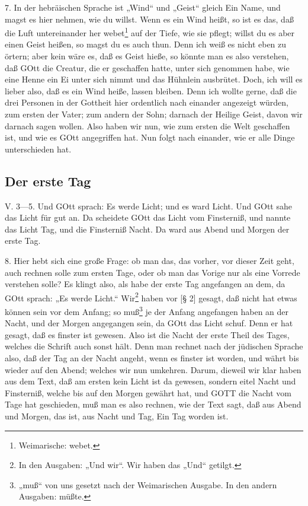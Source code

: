 7. In der hebräischen Sprache ist „Wind“ und „Geist“ gleich Ein Name, und magst es hier nehmen, wie du willst. Wenn es ein Wind heißt, so ist es das, daß die Luft untereinander her webet\footnote{Weimarische: webet.} auf der Tiefe, wie sie pflegt; willst du es aber einen Geist heißen, so magst du es auch thun. Denn ich weiß es nicht eben zu örtern; aber kein wäre es, daß es Geist hieße, so könnte man es also verstehen, daß GOtt die Creatur, die er geschaffen hatte, unter sich genommen habe, wie eine Henne ein Ei unter sich nimmt und das Hühnlein ausbrütet. Doch, ich will es lieber also, daß es ein Wind heiße, lassen bleiben. Denn ich wollte gerne, daß die drei Personen in der Gottheit hier ordentlich nach einander angezeigt würden, zum ersten der Vater; zum andern der Sohn; darnach der Heilige Geist, davon wir darnach sagen wollen. Also haben wir nun, wie zum ersten die Welt geschaffen ist, und wie es GOtt angegriffen hat. Nun folgt nach einander, wie er alle Dinge unterschieden hat.

\subsection{Der erste Tag}

\begin{schriftzitat}
V. 3—5. Und GOtt sprach: Es werde Licht; und es ward Licht. Und GOtt sahe das Licht für gut an. Da scheidete GOtt das Licht vom Finsterniß, und nannte das Licht Tag, und die Finsterniß Nacht. Da ward aus Abend und Morgen der erste Tag.
\end{schriftzitat}

8. Hier hebt sich eine große Frage: ob man das, das vorher, vor dieser Zeit geht, auch rechnen solle zum ersten Tage, oder ob man das Vorige nur als eine Vorrede verstehen solle? Es klingt also, als habe der erste Tag angefangen an dem, da GOtt sprach: „Es werde Licht.“ Wir\footnote{In den Ausgaben: „Und wir“. Wir haben das „Und“ getilgt.} haben vor [§ 2] gesagt, daß nicht hat etwas können sein vor dem Anfang; so muß\footnote{„muß“ von uns gesetzt nach der Weimarischen Ausgabe. In den andern Ausgaben: müßte.} je der Anfang angefangen haben an der Nacht, und der Morgen angegangen sein, da GOtt das Licht schuf. Denn er hat gesagt, daß es finster ist gewesen. Also ist die Nacht der erste Theil des Tages, welches die Schrift auch sonst hält. Denn man rechnet nach der jüdischen Sprache also, daß der Tag an der Nacht angeht, wenn es finster ist worden, und währt bis wieder auf den Abend; welches wir nun umkehren. Darum, dieweil wir klar haben aus dem Text, daß am ersten kein Licht ist da gewesen, sondern
eitel Nacht und Finsterniß, welche bis auf den Morgen gewährt hat, und GOTT die Nacht vom Tage hat geschieden, muß man es also rechnen, wie der Text sagt, daß aus Abend und Morgen, das ist, aus Nacht und Tag, Ein Tag worden ist.

